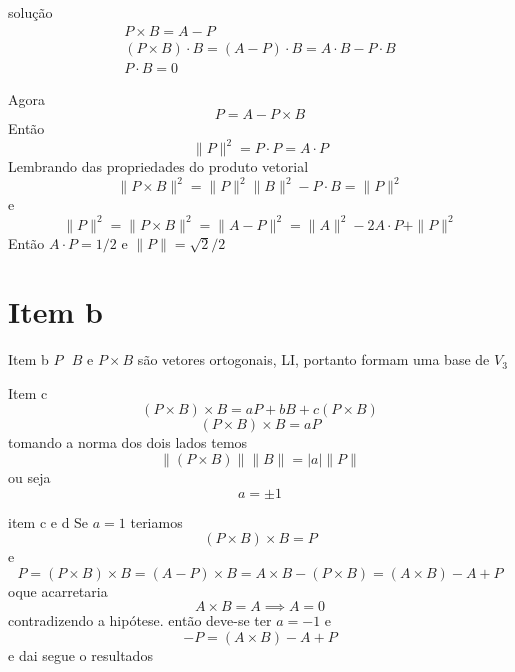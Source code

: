 \documentclass{beamer}
\begin{document}
\begin{frame}{solução}
\begin{gather*}
  P\times B = A-P \\ 
 (P\times B)\cdot B = (A-P)\cdot B = A\cdot B - P\cdot B \\ 
 P\cdot B = 0
\end{gather*}
\end{frame}

\begin{frame}
  Agora 
  $$ P = A-P\times B $$
  \pause 
  Então
  $$ \|P\|^2 =P\cdot P = A\cdot P $$
\pause 
Lembrando das propriedades do produto vetorial 
$$ \|P\times B\|^2 = \|P\|^2 \|B\|^2 - P\cdot B=\| P \|^2 $$ e
$$ \|P\|^2 = \|P\times B\|^2 = \|A-P\|^2 = \|A\|^2 -2A\cdot P +\|P\|^2 $$
Então $ A\cdot P=1/2$ e $\|P\|=\sqrt{2}/2$
\end{frame}

\section{Item b}

\begin{frame}{Item b}
  $P \text{ }B$ e $P\times B$ são vetores ortogonais, LI, portanto formam 
  uma base de $V_3$
\end{frame}

\begin{frame}{Item c}
 $$ (P\times B)\times B = aP+ bB +c(P\times B) $$
 \pause 
 $$ (P\times B)\times B = aP $$
 \pause 
 tomando a norma dos dois lados temos
 $$\|(P\times B)\|\| B \|= |a| \|P\|$$
 ou seja
 $$ a = \pm 1$$
 

\end{frame}

\begin{frame}{item c e d}
  Se $a=1$ teriamos 
  $$(P\times B)\times B=P$$ e
  $$P=(P\times B)\times B= (A-P)\times B = A\times B - (P\times B) = (A\times B) -A +P$$
  oque acarretaria
  $$ A\times B = A \implies A=0$$ 
  contradizendo a hipótese.
\pause
então deve-se ter $a=-1$ e
$$-P = (A\times B) -A +P$$
e dai segue o resultados
\end{frame}
\end{document}
